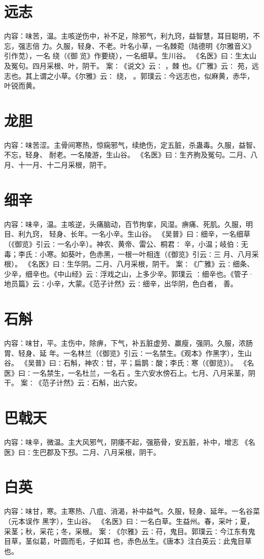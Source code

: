 \documentclass[12pt,UTF8]{ctexbook}
\begin{document}
\section{远志}
内容：味苦，温。主咳逆伤中，补不足，除邪气，利九窍，益智慧，耳目聪明，不忘，强志倍 
力。久服，轻身、不老。叶名小草，一名棘菀（陆德明《尔雅音义》引作苋），一名 绕（《御 
览》作要绕），一名细草。生川谷。 
《名医》曰∶生太山及冤句。四月采根、叶，阴干。 
案∶《说文》云∶ ，棘 也。《广雅》云∶ 苑，远志也。其上谓之小草。《尔雅》云∶ 
绕， 。郭璞云∶今远志也，似麻黄，赤华，叶锐而黄。 


\section{龙胆}
内容：味苦涩。主骨间寒热，惊痫邪气，续绝伤，定五脏，杀蛊毒。久服，益智、不忘，轻身、 
耐老。一名陵游，生山谷。 
《名医》曰∶生齐朐及冤句。二月、八月、十一月、十二月采根，阴干。 


\section{细辛}
内容：味辛，温。主咳逆，头痛脑动，百节拘挛，风湿。痹痛、死肌。久服，明目、利九窍， 
轻身、长年。一名小辛。生山谷。 
《吴普》曰∶细辛，一名细草（《御览》引云∶一名小辛）。神农、黄帝、雷公、桐君∶ 
辛，小温；岐伯∶无毒；李氏∶小寒。如葵叶，色赤黑，一根一叶相连（《御览》引云∶三 
月、八月采根）。 
《名医》曰∶生华阴。二月、八月采根，阴干。 
案∶《广雅》云∶细条、少辛，细辛也。《中山经》云∶浮戏之山，上多少辛。郭璞云 
∶细辛也。《管子·地员篇》云∶小辛，大蒙。《范子计然》云∶细辛，出华阴，色白者， 
善。 


\section{石斛}
内容：味甘，平。主伤中，除痹，下气，补五脏虚劳、羸瘦，强阴。久服，浓肠胃、轻身、延 
年。一名林兰（《御览》引云∶一名禁生。《观本》作黑字），生山谷。 
《吴普》曰∶石斛，神农∶甘，平；扁鹊∶酸；李氏∶寒（《御览》）。 
《名医》曰∶一名禁生，一名杜兰，一名石 。生六安水傍石上。七月、八月采茎，阴 
干。 
案∶《范子计然》云∶石斛，出六安。 


\section{巴戟天}
内容：味辛，微温。主大风邪气，阴痿不起，强筋骨，安五脏，补中，增志 
《名医》曰∶生巴郡及下邳。二月、八月采根，阴干。 


\section{白英}
内容：味甘，寒。主寒热、八疽、消渴，补中益气。久服，轻身、延年。一名谷菜（元本误作 
黑字），生山谷。 
《名医》曰∶一名白草。生益州。春，采叶；夏，采茎；秋，采花；冬，采根。 
案∶《尔雅》云∶苻，鬼目。郭璞云∶今江东有鬼目草，茎似葛，叶圆而毛，子如耳 
也，赤色丛生。《唐本》注白英云∶此鬼目草也。 
\end{document}
